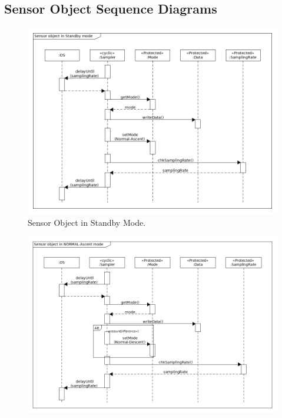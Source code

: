 \begin{landscape}
\subsection{Sensor Object Sequence Diagrams}
\begin{figure}[H]
    \centering
    \includegraphics[height=0.8\textwidth]{appendix/img/sensor-seq-dia-a.png}
    \caption{Sensor Object in Standby Mode.}
    \label{sensora}
\end{figure}
\begin{figure}[H]
    \centering
    \includegraphics[height=0.9\textwidth]{appendix/img/sensor-seq-dia-b.png}

\end{figure}
\end{landscape}
